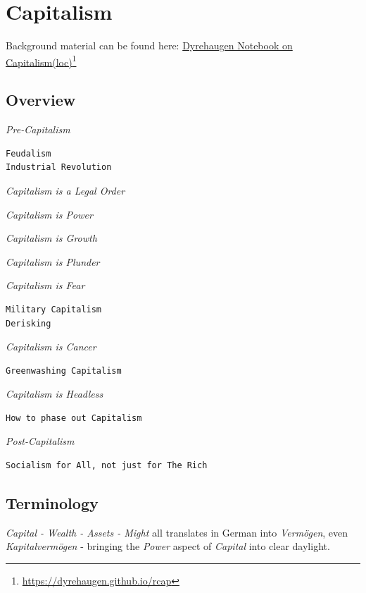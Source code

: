 \documentclass[
]{book}
\begin{document}
\hypertarget{capitalism}{%
\chapter{Capitalism}\label{capitalism}}

Background material can be found here: \href{https://dyrehaugen.github.io/rcap}{Dyrehaugen Notebook on Capitalism}\href{http://localhost/rcap}{(loc)}\footnote{\url{https://dyrehaugen.github.io/rcap}}

\hypertarget{overview}{%
\section{Overview}\label{overview}}

\emph{Pre-Capitalism}

\begin{verbatim}
Feudalism
Industrial Revolution
\end{verbatim}

\emph{Capitalism is a Legal Order}

\emph{Capitalism is Power}

\emph{Capitalism is Growth}

\emph{Capitalism is Plunder}

\emph{Capitalism is Fear}

\begin{verbatim}
Military Capitalism  
Derisking  
\end{verbatim}

\emph{Capitalism is Cancer}

\begin{verbatim}
Greenwashing Capitalism  
\end{verbatim}

\emph{Capitalism is Headless}

\begin{verbatim}
How to phase out Capitalism  
\end{verbatim}

\emph{Post-Capitalism}

\begin{verbatim}
Socialism for All, not just for The Rich
\end{verbatim}

\hypertarget{terminology}{%
\section{Terminology}\label{terminology}}

\emph{Capital - Wealth - Assets - Might} all translates in German into \emph{Vermögen}, even \emph{Kapitalvermögen}
- bringing the \emph{Power} aspect of \emph{Capital} into clear daylight.
\end{document}
